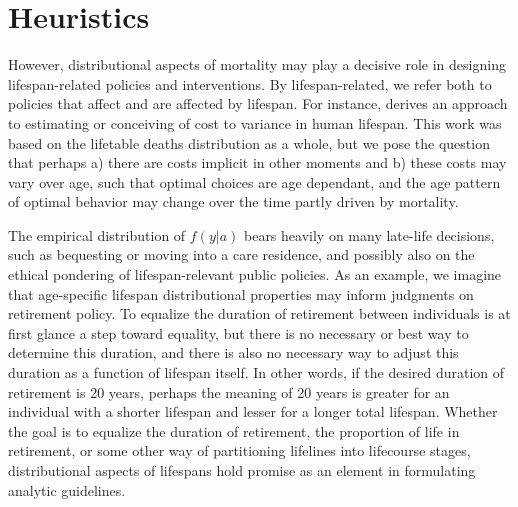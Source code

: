 \documentclass{article}
\begin{document}
\section*{Heuristics}

However, distributional aspects of mortality may play a decisive role in designing lifespan-related policies and interventions. By lifespan-related, we refer both to policies that affect and are affected by lifespan. For instance, \citet{edwards2013cost} derives an approach to estimating or conceiving of cost to variance in human lifespan. This work was based on the lifetable deaths distribution as a whole, but we pose the question that perhaps a) there are costs implicit in other moments and b) these costs may
vary over age, such that optimal choices are age dependant, and the age pattern
of optimal behavior may change over the time partly driven by mortality. 

The empirical distribution
of $f(y|a)$ bears heavily on many late-life
decisions, such as bequesting or moving into a care residence, and possibly also
on the ethical pondering of lifespan-relevant public policies. As an
example, we imagine that age-specific lifespan distributional properties may inform judgments on retirement policy. To equalize the duration of retirement between individuals is at
first glance a step toward equality, but there is no necessary or best way to
determine this duration, and there is also no necessary way to adjust this duration as a function of lifespan itself. In other words, if the desired duration of retirement is 20 years, perhaps the meaning of 20 years is greater for an individual with a shorter lifespan and lesser for a longer total lifespan. Whether the goal is to
equalize the duration of retirement, the proportion of life in retirement, or
some other way of partitioning lifelines into lifecourse stages, distributional
aspects of lifespans hold promise as an element in formulating analytic
guidelines.



\end{document}

